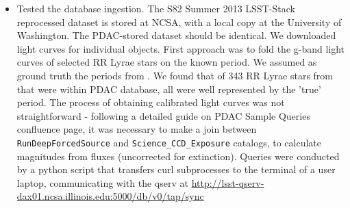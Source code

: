 \documentclass[fleqn,usenatbib, onecolumn]{mnras} %
\begin{document}
\begin{itemize}
	
    \item Tested the database ingestion. The S82 Summer 2013 LSST-Stack reprocessed dataset is stored at NCSA, with a local copy at the University of Washington.  The PDAC-stored dataset should be identical. We downloaded light curves for individual objects. First approach was to fold the g-band light curves of selected RR Lyrae stars on the known period.  We assumed as ground truth the periods from \cite{sesar2010}.  We found that of 343  RR Lyrae stars from \cite{sesar2010} that were within PDAC database,  all were well represented by the 'true' period.  The process of obtaining calibrated light curves was not straightforward  - following a detailed guide on PDAC Sample Queries confluence page, it was necessary to  make a join between \verb|RunDeepForcedSource| and \verb|Science_CCD_Exposure| catalogs, to calculate magnitudes from fluxes (uncorrected for extinction).  Queries were conducted by  a python script that transfers curl subprocesses to the terminal of a user laptop, communicating with the qserv  at \url{http://lsst-qserv-dax01.ncsa.illinois.edu:5000/db/v0/tap/sync}

 \end{itemize}   








\bsp	%
\label{lastpage}
\end{document}
